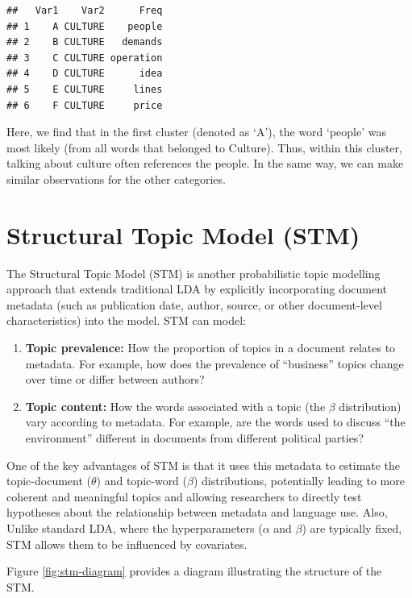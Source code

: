 \documentclass[
]{book}
\providecommand{\tightlist}{%
  \setlength{\itemsep}{0pt}\setlength{\parskip}{0pt}}
\begin{document}
\begin{verbatim}
##   Var1    Var2      Freq
## 1    A CULTURE    people
## 2    B CULTURE   demands
## 3    C CULTURE operation
## 4    D CULTURE      idea
## 5    E CULTURE     lines
## 6    F CULTURE     price
\end{verbatim}

Here, we find that in the first cluster (denoted as `A'), the word `people' was most likely (from all words that belonged to Culture). Thus, within this cluster, talking about culture often references the people. In the same way, we can make similar observations for the other categories.

\section{Structural Topic Model (STM)}\label{structural-topic-model-stm}

The Structural Topic Model (STM) is another probabilistic topic modelling approach that extends traditional LDA by explicitly incorporating document metadata (such as publication date, author, source, or other document-level characteristics) into the model.
STM can model:

\begin{enumerate}
\def\labelenumi{\arabic{enumi}.}
\tightlist
\item
  \textbf{Topic prevalence:} How the proportion of topics in a document relates to metadata. For example, how does the prevalence of ``business'' topics change over time or differ between authors?
\item
  \textbf{Topic content:} How the words associated with a topic (the \(\beta\) distribution) vary according to metadata. For example, are the words used to discuss ``the environment'' different in documents from different political parties?
\end{enumerate}

One of the key advantages of STM is that it uses this metadata to estimate the topic-document (\(\theta\)) and topic-word (\(\beta\)) distributions, potentially leading to more coherent and meaningful topics and allowing researchers to directly test hypotheses about the relationship between metadata and language use. Also, Unlike standard LDA, where the hyperparameters (\(\alpha\) and \(\beta\)) are typically fixed, STM allows them to be influenced by covariates.

Figure \ref{fig:stm-diagram} provides a diagram illustrating the structure of the STM.
\end{document}
